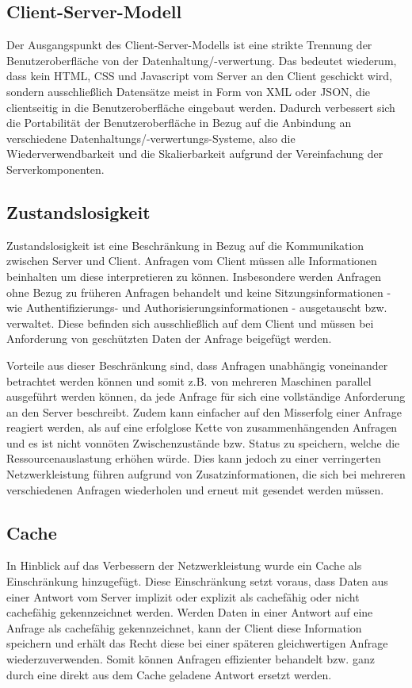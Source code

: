 \subsection{Client-Server-Modell}
Der Ausgangspunkt des Client-Server-Modells ist eine strikte Trennung der Benutzeroberfläche von der Datenhaltung/-verwertung.
Das bedeutet wiederum, dass kein HTML, CSS und Javascript vom Server an den Client geschickt wird, sondern ausschließlich Datensätze
meist in Form von XML oder JSON, die clientseitig in die Benutzeroberfläche eingebaut werden.
Dadurch verbessert sich die Portabilität der Benutzeroberfläche in Bezug auf die Anbindung an verschiedene Datenhaltungs/-verwertungs-Systeme,
also die Wiederverwendbarkeit und die Skalierbarkeit aufgrund der Vereinfachung der Serverkomponenten.

\subsection{Zustandslosigkeit}
Zustandslosigkeit ist eine Beschränkung in Bezug auf die Kommunikation zwischen Server und Client.
Anfragen vom Client müssen alle Informationen beinhalten um diese interpretieren zu können.
Insbesondere werden Anfragen ohne Bezug zu früheren Anfragen behandelt und keine Sitzungsinformationen -
wie Authentifizierungs- und Authorisierungsinformationen - ausgetauscht bzw. verwaltet.
Diese befinden sich ausschließlich auf dem Client und müssen bei Anforderung von geschützten Daten der Anfrage beigefügt werden.

Vorteile aus dieser Beschränkung sind, dass Anfragen unabhängig voneinander betrachtet werden können
und somit z.B. von mehreren Maschinen parallel ausgeführt werden können, da jede Anfrage für sich eine vollständige Anforderung an den Server beschreibt.
Zudem kann einfacher auf den Misserfolg einer Anfrage reagiert werden, als auf eine erfolglose Kette von zusammenhängenden Anfragen
und es ist nicht vonnöten Zwischenzustände bzw. Status zu speichern, welche die Ressourcenauslastung erhöhen würde.
Dies kann jedoch zu einer verringerten Netzwerkleistung führen aufgrund von Zusatzinformationen,
die sich bei mehreren verschiedenen Anfragen wiederholen und erneut mit gesendet werden müssen.

\subsection{Cache}
In Hinblick auf das Verbessern der Netzwerkleistung wurde ein Cache als Einschränkung hinzugefügt.
Diese Einschränkung setzt voraus, dass Daten aus einer Antwort vom Server implizit oder explizit als cachefähig oder nicht cachefähig gekennzeichnet werden.
Werden Daten in einer Antwort auf eine Anfrage als cachefähig gekennzeichnet, kann der Client diese Information speichern und erhält das Recht diese
bei einer späteren gleichwertigen Anfrage wiederzuverwenden.
Somit können Anfragen effizienter behandelt bzw. ganz durch eine direkt aus dem Cache geladene Antwort ersetzt werden.

